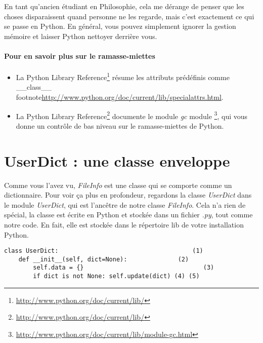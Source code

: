 En tant qu'ancien étudiant en Philosophie, cela me dérange de penser que les choses disparaissent quand personne ne les regarde, mais c'est exactement ce qui se passe en Python. En général, vous pouvez simplement ignorer la gestion mémoire et laisser Python nettoyer derrière vous.

\paragraph{Pour en savoir plus sur le ramasse-miettes}
\begin{itemize}
  \item La Python Library Reference\footnote{\url{http://www.python.org/doc/current/lib/}} résume les attributs prédéfinis comme \_\_class\_\_  footnote{\url{http://www.python.org/doc/current/lib/specialattrs.html}}.
  \item La Python Library Reference\footnote{\url{http://www.python.org/doc/current/lib/}} documente le module \emph{gc} module \footnote{\url{http://www.python.org/doc/current/lib/module-gc.html}}, qui vous donne un contrôle de bas niveau sur le ramasse-miettes de Python.
\end{itemize}

\section{UserDict : une classe enveloppe}

Comme vous l'avez vu, \emph{FileInfo} est une classe qui se comporte comme un dictionnaire. Pour voir ça plus en profondeur, regardons la classe \emph{UserDict} dans le module \emph{UserDict}, qui est l'ancêtre de notre classe \emph{FileInfo}. Cela n'a rien de spécial, la classe est écrite en Python et stockée dans un fichier \emph{.py}, tout comme notre code. En fait, elle est stockée dans le répertoire lib de votre installation Python.


\begin{example}
\begin{lstlisting}
class UserDict:                                     (1)
    def __init__(self, dict=None):              (2)
        self.data = {}                                 (3)
        if dict is not None: self.update(dict) (4) (5)
\end{lstlisting}
\end{example}

